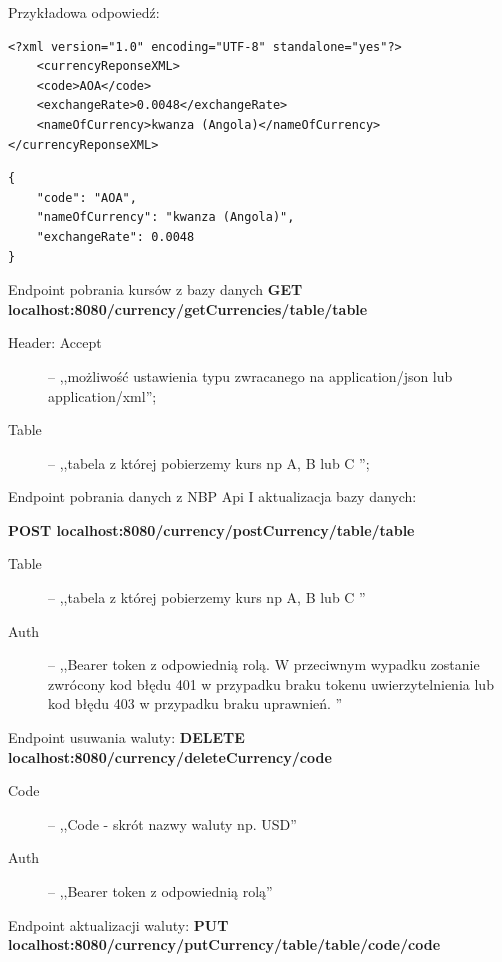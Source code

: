 \documentclass{iiuwb}
\begin{document}
Przykładowa odpowiedź: 

\begin{lstlisting}[breaklines=true]
<?xml version="1.0" encoding="UTF-8" standalone="yes"?> 
    <currencyReponseXML> 
    <code>AOA</code> 
    <exchangeRate>0.0048</exchangeRate> 
    <nameOfCurrency>kwanza (Angola)</nameOfCurrency> 
</currencyReponseXML>
\end{lstlisting}

\begin{lstlisting}[breaklines=true]
{ 
    "code": "AOA", 
    "nameOfCurrency": "kwanza (Angola)", 
    "exchangeRate": 0.0048 
} 
\end{lstlisting}

Endpoint pobrania kursów z bazy danych \textbf{GET localhost:8080/currency/\newline getCurrencies/table/{table}} 

\begin{description}
  \item[Header: Accept] -- ,,możliwość ustawienia typu zwracanego na application/json lub application/xml'';
  \item[Table]  -- ,,tabela z której pobierzemy kurs np A, B lub C '';
\end{description}


Endpoint pobrania danych z NBP Api I aktualizacja bazy danych: 

\textbf{POST localhost:8080/currency/postCurrency/table/{table}}

\begin{description}
  \item[Table]  -- ,,tabela z której pobierzemy kurs np A, B lub C ''
  \item[Auth] -- ,,Bearer token z odpowiednią rolą. W przeciwnym wypadku zostanie zwrócony kod błędu 401 w przypadku braku tokenu uwierzytelnienia lub kod błędu 403 w przypadku braku uprawnień. ''
\end{description}

Endpoint usuwania waluty: \textbf{DELETE localhost:8080/currency/deleteCurrency/{code}} 
\newline

\begin{description}
  \item[Code]  -- ,,Code - skrót nazwy waluty np. USD''
  \item[Auth] -- ,,Bearer token z odpowiednią rolą''
\end{description}

Endpoint aktualizacji waluty: \textbf{PUT localhost:8080/currency/putCurrency/table/{table}/code/{code}}
\end{document}
